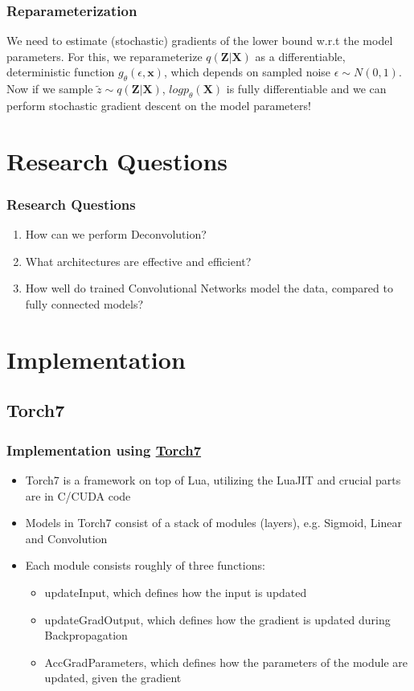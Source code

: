 \documentclass{beamer}
\begin{document}
\begin{frame}
\frametitle{Reparameterization}
We need to estimate (stochastic) gradients of the lower bound w.r.t the model parameters. For this, we reparameterize $q(\mathbf{Z}|\mathbf{X})$ as a differentiable, deterministic function $g_{\theta}(\epsilon,\mathbf{x})$, which depends on sampled noise $\epsilon \sim N(0,1)$. \\ Now if we sample $\tilde{z} \sim q(\mathbf{Z}|\mathbf{X})$, $logp_{\theta}(\mathbf{X})$ is fully differentiable and we can perform stochastic gradient descent on the model parameters!
\end{frame}


\section{Research Questions}
\begin{frame}
\frametitle{Research Questions}
\begin{enumerate}
	\item How can we perform Deconvolution?
	\item What architectures are effective and efficient?
	\item How well do trained Convolutional Networks model the data, compared to fully connected models?
\end{enumerate}
\end{frame}

\section{Implementation}

\subsection{Torch7}
\begin{frame}
\frametitle{Implementation using \href{http://torch.ch/}{Torch7}}
\begin{itemize}
	\item Torch7 is a framework on top of Lua, utilizing the LuaJIT and crucial parts are in C/CUDA code
	\item Models in Torch7 consist of a stack of modules (layers), e.g. Sigmoid, Linear and Convolution
	\item Each module consists roughly of three functions:
		\begin{itemize}
			\item updateInput, which defines how the input is updated
			\item updateGradOutput, which defines how the gradient is updated during Backpropagation
			\item AccGradParameters, which defines how the parameters of the module are updated, given the gradient
		\end{itemize}
\end{itemize}
\end{frame}
\end{document}
